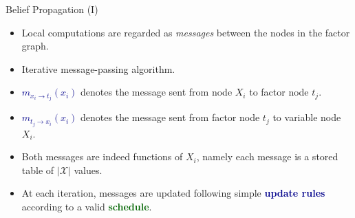 \documentclass[10pt]{beamer}
\newcommand{\set}[1]{\mathcal{#1}}
\newcommand{\noteB}[1]{\textbf{\textcolor{darkblue}{#1}}}
\newcommand{\noteG}[1]{\textbf{\textcolor{darkgreen}{#1}}}
\newcommand{\mes}[2]{m_{#1\rightarrow#2}}
\begin{document}
\begin{frame}{Belief Propagation (I)}
\begin{itemize}
\item Local computations are regarded as \emph{messages}  between the nodes in the factor graph.
\item Iterative message-passing algorithm.
\item \noteB{$\mes{x_i}{t_j}(x_i)$} denotes the message sent from node $X_i$ to factor node $t_j$.
\item \noteB{$\mes{t_j}{x_i}(x_i)$} denotes the message sent from factor node $t_j$ to variable node $X_i$.
\item Both  messages are indeed functions of $X_i$, namely each message is a stored table of $|\set{X}|$ values.
\item At each iteration, messages are updated following simple \noteB{update rules} according to a valid \noteG{schedule}.
\end{itemize}

\end{frame}
\end{document}

